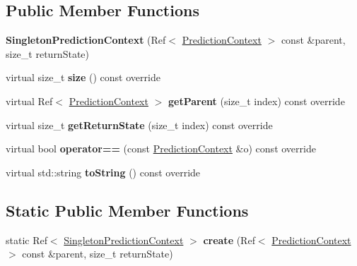 \subsection*{Public Member Functions}
\begin{DoxyCompactItemize}
\item 
\mbox{\label{classantlr4_1_1atn_1_1SingletonPredictionContext_a2e2a3223337d46698280373ba45c2ea8}} 
{\bfseries Singleton\+Prediction\+Context} (Ref$<$ \hyperlink{classantlr4_1_1atn_1_1PredictionContext}{Prediction\+Context} $>$ const \&parent, size\+\_\+t return\+State)
\item 
\mbox{\label{classantlr4_1_1atn_1_1SingletonPredictionContext_a8f4a52dd672bb563f8186ac2e297cc71}} 
virtual size\+\_\+t {\bfseries size} () const override
\item 
\mbox{\label{classantlr4_1_1atn_1_1SingletonPredictionContext_aa1884f49ec56a3a9c56b3c0f5d207cdd}} 
virtual Ref$<$ \hyperlink{classantlr4_1_1atn_1_1PredictionContext}{Prediction\+Context} $>$ {\bfseries get\+Parent} (size\+\_\+t index) const override
\item 
\mbox{\label{classantlr4_1_1atn_1_1SingletonPredictionContext_a3c321d139560065118fd161ec9bc20bd}} 
virtual size\+\_\+t {\bfseries get\+Return\+State} (size\+\_\+t index) const override
\item 
\mbox{\label{classantlr4_1_1atn_1_1SingletonPredictionContext_a75923846167752f0b9c2515d6b031847}} 
virtual bool {\bfseries operator==} (const \hyperlink{classantlr4_1_1atn_1_1PredictionContext}{Prediction\+Context} \&o) const override
\item 
\mbox{\label{classantlr4_1_1atn_1_1SingletonPredictionContext_a5a09bbbcc4f88e663bbe521f5b908d86}} 
virtual std\+::string {\bfseries to\+String} () const override
\end{DoxyCompactItemize}
\subsection*{Static Public Member Functions}
\begin{DoxyCompactItemize}
\item 
\mbox{\label{classantlr4_1_1atn_1_1SingletonPredictionContext_a5b43e80fd63c003c6b8c570c4d457121}} 
static Ref$<$ \hyperlink{classantlr4_1_1atn_1_1SingletonPredictionContext}{Singleton\+Prediction\+Context} $>$ {\bfseries create} (Ref$<$ \hyperlink{classantlr4_1_1atn_1_1PredictionContext}{Prediction\+Context} $>$ const \&parent, size\+\_\+t return\+State)
\end{DoxyCompactItemize}
